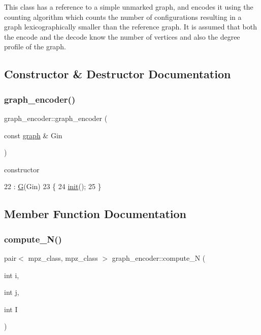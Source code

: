 This class has a reference to a simple unmarked graph, and encodes it using the counting algorithm which counts the number of configurations resulting in a graph lexicographically smaller than the reference graph. It is assumed that both the encode and the decode know the number of vertices and also the degree profile of the graph. 

\subsection{Constructor \& Destructor Documentation}
\mbox{\label{classgraph__encoder_ac2d2390b126ba3ab21406d0df8757ab6}} 
\subsubsection{\texorpdfstring{graph\+\_\+encoder()}{graph\_encoder()}}
{\footnotesize\ttfamily graph\+\_\+encoder\+::graph\+\_\+encoder (\begin{DoxyParamCaption}\item[{const \hyperlink{classgraph}{graph} \&}]{Gin }\end{DoxyParamCaption})\hspace{0.3cm}{\ttfamily [inline]}}



constructor 


\begin{DoxyCode}
22                                 : \hyperlink{classgraph__encoder_a56d8ab1a423e192c6f80514ff5e5cfec}{G}(Gin)
23   \{
24     \hyperlink{classgraph__encoder_a197200e714da86ec133ab07bb45e5313}{init}();
25   \}
\end{DoxyCode}


\subsection{Member Function Documentation}
\mbox{\label{classgraph__encoder_ad2f997218e6527b869166e778c79672c}} 
\subsubsection{\texorpdfstring{compute\+\_\+\+N()}{compute\_N()}}
{\footnotesize\ttfamily pair$<$ mpz\+\_\+class, mpz\+\_\+class $>$ graph\+\_\+encoder\+::compute\+\_\+N (\begin{DoxyParamCaption}\item[{int}]{i,  }\item[{int}]{j,  }\item[{int}]{I }\end{DoxyParamCaption})}



